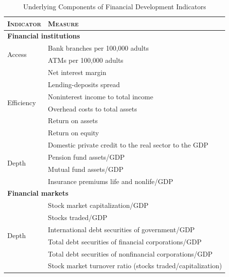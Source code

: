 \documentclass[a4paper,11pt]{article}
\begin{document}
\begin{table}[ht!]
    \small
    \caption{Underlying Components of Financial Development Indicators}
    \label{tab:finind}
    \centering
    \begin{tabular}{ll}
      \toprule
      \textsc{Indicator} & \textsc{Measure} \\
      \midrule
      \multicolumn{2}{l}{\textbf{Financial institutions}} \\
      \midrule
      \multirow{2}{*}{Access} 	& Bank branches per 100,000 adults \\
                                  & ATMs per 100,000 adults \\
      \midrule
      \multirow{6}{*}{Efficiency}		& Net interest margin \\
                                  & Lending-deposits spread \\ 
                                  & Noninterest income to total income \\
                                  & Overhead costs to total assets \\
                                  & Return on assets \\
                                  & Return on equity \\
            
      \midrule
      \multirow{4}{*}{Depth}	& Domestic private credit to the real sector to the GDP \\
                                  & Pension fund assets/GDP \\
                                  & Mutual fund assets/GDP \\
                                  & Insurance premiums life and nonlife/GDP \\
      \midrule
      \multicolumn{2}{l}{\textbf{Financial markets}} \\
      \midrule
      \multirow{6}{*}{Depth} 	& Stock market capitalization/GDP \\
                                  & Stocks traded/GDP \\
                                  & International debt securities of government/GDP \\
                                  & Total debt securities of financial corporations/GDP \\
                                  & Total debt securities of nonfinancial corporations/GDP \\
      \midrule
      Efficiency                  & Stock market turnover ratio (stocks traded/capitalization) \\
      \bottomrule
    \end{tabular}
\end{table}
\end{document}
